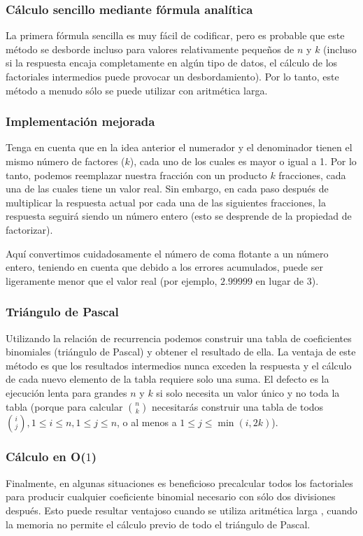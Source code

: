 \subsubsection{Cálculo sencillo mediante fórmula analítica}
La primera fórmula sencilla es muy fácil de codificar, pero es probable que este método se desborde incluso para valores relativamente pequeños de $n$ y $k$ (incluso si la respuesta encaja completamente en algún tipo de datos, el cálculo de los factoriales intermedios puede provocar un desbordamiento). Por lo tanto, este método a menudo sólo se puede utilizar con aritmética larga.

\subsubsection{Implementación mejorada}

Tenga en cuenta que en la idea anterior el numerador y el denominador tienen el mismo número de factores ($k$), cada uno de los cuales es mayor o igual a 1. Por lo tanto, podemos reemplazar nuestra fracción con un producto $k$ fracciones, cada una de las cuales tiene un valor real. Sin embargo, en cada paso después de multiplicar la respuesta actual por cada una de las siguientes fracciones, la respuesta seguirá siendo un número entero (esto se desprende de la propiedad de factorizar).

Aquí convertimos cuidadosamente el número de coma flotante a un número entero, teniendo en cuenta que debido a los errores acumulados, puede ser ligeramente menor que el valor real (por ejemplo, $2.99999$ en lugar de $3$).

\subsubsection{Triángulo de Pascal}

Utilizando la relación de recurrencia podemos construir una tabla de  coeficientes binomiales (triángulo de Pascal) y obtener el resultado de  ella. La ventaja de este método es que los 
resultados intermedios nunca exceden la respuesta y el cálculo de cada nuevo elemento de la tabla requiere solo una suma. El defecto es la ejecución lenta para grandes $n$ y $k$ si solo necesita 
un valor único y no toda la tabla (porque para calcular $\binom n k$ necesitarás construir una tabla de todos $\binom i j, 1 \le i \le n, 1 \le j \le n$, o al menos a $1 \le j \le \min (i,2k)$).

\subsubsection{Cálculo en O($1$) }

Finalmente, en algunas situaciones es beneficioso precalcular todos los factoriales para producir cualquier coeficiente binomial necesario con sólo dos divisiones después. Esto puede resultar ventajoso cuando se utiliza aritmética larga , cuando la memoria no permite el cálculo previo de todo el triángulo de Pascal.
